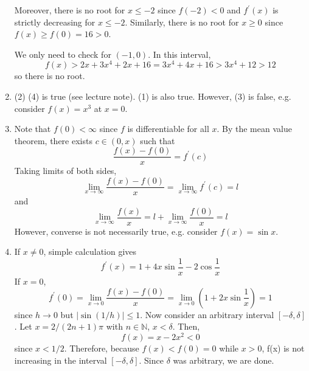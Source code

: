 \documentclass[10pt, a4paper, twoside]{report}
\begin{document}
\begin{enumerate}[{1.}]
    Moreover, there is no root for \(x\leq -2\) since \(f(-2)<0\) and \(f^\prime(x)\) is strictly decreasing for \(x\leq -2\). Similarly, there is no root for \(x\geq 0\) since \(f(x)\geq f(0)=16>0\).

    We only need to check for \((-1,0)\). In this interval, 
    \[f(x)>2x+3x^4+2x+16=3x^4+4x+16>3x^4+12>12\]
    so there is no root.
    \item (2) (4) is true (see lecture note). (1) is also true. However, (3) is false, e.g. consider \(f(x)=x^3\) at \(x=0\).
    \item Note that \(f(0)<\infty\) since \(f\) is differentiable for all \(x\). By the mean value theorem, there exists \(c\in(0,x)\) such that 
    \[\frac{f(x)-f(0)}{x}=f^\prime(c)\]
    Taking limits of both sides,
    \[\lim_{x\to\infty}\frac{f(x)-f(0)}{x}=\lim_{x\to\infty}f^\prime(c)=l\]
    and
    \[\lim_{x\to\infty}\frac{f(x)}{x}=l+\lim_{x\to\infty}\frac{f(0)}{x}=l\]
    However, converse is not necessarily true, e.g. consider \(f(x)=\sin x\).
    \item If \(x\neq 0\), simple calculation gives 
    \[f^\prime(x)=1+4x\sin\frac 1x-2\cos\frac 1x\]
    If \(x=0\),
    \[f^\prime(0)=\lim_{x\to 0}\frac{f(x)-f(0)}{x}=\lim_{x\to 0}\left(1+2x\sin\frac 1x\right)=1\]
    since \(h\to 0\) but \(|\sin(1/h)|\leq 1\). Now consider an arbitrary interval \([-\delta,\delta]\). Let \(x=2/(2n+1)\pi\) with \(n\in\mathbb{N}\), \(x<\delta\). Then,
    \[f(x)=x-2x^2<0\]
    since \(x<1/2\). Therefore, because \(f(x)<f(0)=0\) while \(x>0\), f(x) is not increasing in the interval \([-\delta,\delta]\). Since \(\delta\) was arbitrary, we are done.
\end{enumerate}
\end{document}
